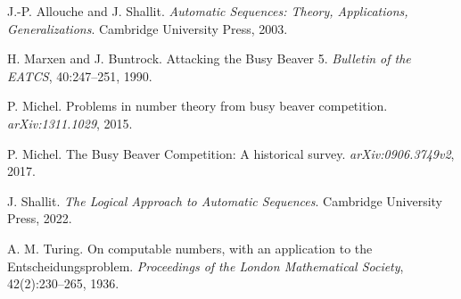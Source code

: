 \begin{thebibliography}{10}

J.-P. Allouche and J. Shallit.
\emph{Automatic Sequences: Theory, Applications, Generalizations}.
Cambridge University Press, 2003.

H. Marxen and J. Buntrock.
Attacking the Busy Beaver 5.
\emph{Bulletin of the EATCS}, 40:247--251, 1990.

P. Michel.
Problems in number theory from busy beaver competition.
\emph{arXiv:1311.1029}, 2015.

P. Michel.
The Busy Beaver Competition: A historical survey.
\emph{arXiv:0906.3749v2}, 2017.

J. Shallit.
\emph{The Logical Approach to Automatic Sequences}.
Cambridge University Press, 2022.

A. M. Turing.
On computable numbers, with an application to the Entscheidungsproblem.
\emph{Proceedings of the London Mathematical Society}, 42(2):230--265, 1936.

\end{thebibliography}
